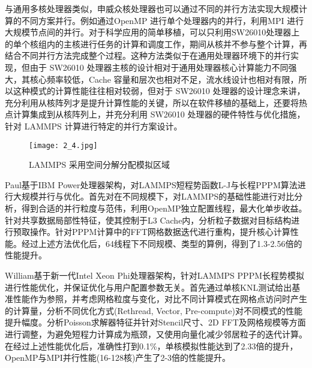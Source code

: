 与通用多核处理器类似，申威众核处理器也可以通过不同的并行方法实现大规模计算的不同方案并行。例如通过OpenMP 进行单个处理器内的并行，利用MPI 进行大规模节点间的并行。对于科学应用的简单移植，可以只利用SW26010处理器上的单个核组内的主核进行任务的计算和调度工作，期间从核并不参与整个计算，再结合不同并行方法完成整个过程。这种方法类似于在通用处理器环境下的并行实现，但由于 SW26010 处理器主核的设计相对于通用处理器核心计算能力不同强大，其核心频率较低，Cache 容量和层次也相对不足，流水线设计也相对有限，所以这种模式的计算性能往往相对较弱，但对于 SW26010 处理器的设计理念来讲，充分利用从核阵列才是提升计算性能的关键，所以在软件移植的基础上，还要将热点计算集成到从核阵列上，并充分利用 SW26010 处理器的硬件特性与优化措施，针对 LAMMPS 计算进行特定的并行方案设计。

 \begin{figure}[h]
  \centering
  \texttt{[image: 2\_4.jpg]}
  \caption{LAMMPS 采用空间分解分配模拟区域}
 \end{figure}

 Paul基于IBM Power处理器架构，对LAMMPS短程势函数L-J与长程PPPM算法进行大规模并行与优化。首先对在不同规模下，对LAMMPS的基础性能进行对比分析，得到合适的并行粒度与范伟，利用OpenMP独立配置线程，最大化单步收益。针对共享数据局部性特征，使其控制于L3 Cache内，分析粒子数据对目标结构进行预取操作。针对PPPM计算中的FFT网格数据迭代进行重构，提升核心计算性能。经过上述方法优化后，64线程下不同规模、类型的算例，得到了1.3-2.56倍的性能提升。

  William基于新一代Intel Xeon Phi处理器架构，针对LAMMPS PPPM长程势模拟进行性能优化，并保证优化与用户配置参数无关。首先通过单核KNL测试给出基准性能作为参照，并考虑网格粒度与变化，对比不同计算模式在网格点访问时产生的计算量，分析不同优化方式(Rethread, Vector, Pre-compute)对不同模式的性能提升幅度。分析Poisson求解器特征并针对Stencil尺寸、2D FFT及网格规模等方面进行调整，为避免短程力计算成为瓶颈，又使用向量化减少邻居粒子的迭代计算。在经过上述性能优化后，准确性打到0.1\%，单核模拟性能达到了2.33倍的提升，OpenMP与MPI并行性能(16-128核)产生了2-3倍的性能提升。

